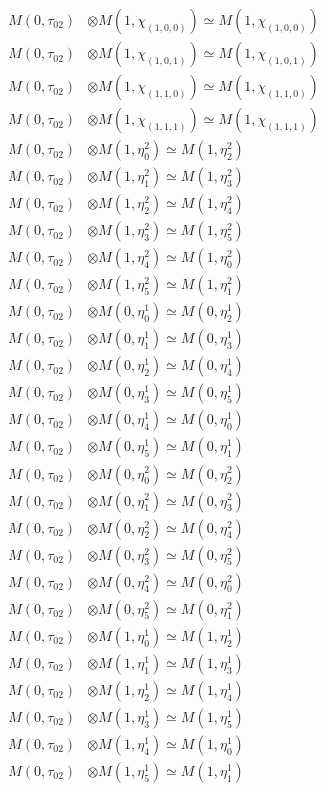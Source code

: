 \begin{align*}
M(0,\tau_{02}) &\otimes M(1,\chi_{(1,0,0)}) \simeq M(1,\chi_{(1,0,0)}) \\
M(0,\tau_{02}) &\otimes M(1,\chi_{(1,0,1)}) \simeq M(1,\chi_{(1,0,1)}) \\
M(0,\tau_{02}) &\otimes M(1,\chi_{(1,1,0)}) \simeq M(1,\chi_{(1,1,0)}) \\
M(0,\tau_{02}) &\otimes M(1,\chi_{(1,1,1)}) \simeq M(1,\chi_{(1,1,1)}) \\
M(0,\tau_{02}) &\otimes M(1,\eta^{2}_{0}) \simeq M(1,\eta^{2}_{2}) \\
M(0,\tau_{02}) &\otimes M(1,\eta^{2}_{1}) \simeq M(1,\eta^{2}_{3}) \\
M(0,\tau_{02}) &\otimes M(1,\eta^{2}_{2}) \simeq M(1,\eta^{2}_{4}) \\
M(0,\tau_{02}) &\otimes M(1,\eta^{2}_{3}) \simeq M(1,\eta^{2}_{5}) \\
M(0,\tau_{02}) &\otimes M(1,\eta^{2}_{4}) \simeq M(1,\eta^{2}_{0}) \\
M(0,\tau_{02}) &\otimes M(1,\eta^{2}_{5}) \simeq M(1,\eta^{2}_{1}) \\
M(0,\tau_{02}) &\otimes M(0,\eta^{1}_{0}) \simeq M(0,\eta^{1}_{2}) \\
M(0,\tau_{02}) &\otimes M(0,\eta^{1}_{1}) \simeq M(0,\eta^{1}_{3}) \\
M(0,\tau_{02}) &\otimes M(0,\eta^{1}_{2}) \simeq M(0,\eta^{1}_{4}) \\
M(0,\tau_{02}) &\otimes M(0,\eta^{1}_{3}) \simeq M(0,\eta^{1}_{5}) \\
M(0,\tau_{02}) &\otimes M(0,\eta^{1}_{4}) \simeq M(0,\eta^{1}_{0}) \\
M(0,\tau_{02}) &\otimes M(0,\eta^{1}_{5}) \simeq M(0,\eta^{1}_{1}) \\
M(0,\tau_{02}) &\otimes M(0,\eta^{2}_{0}) \simeq M(0,\eta^{2}_{2}) \\
M(0,\tau_{02}) &\otimes M(0,\eta^{2}_{1}) \simeq M(0,\eta^{2}_{3}) \\
M(0,\tau_{02}) &\otimes M(0,\eta^{2}_{2}) \simeq M(0,\eta^{2}_{4}) \\
M(0,\tau_{02}) &\otimes M(0,\eta^{2}_{3}) \simeq M(0,\eta^{2}_{5}) \\
M(0,\tau_{02}) &\otimes M(0,\eta^{2}_{4}) \simeq M(0,\eta^{2}_{0}) \\
M(0,\tau_{02}) &\otimes M(0,\eta^{2}_{5}) \simeq M(0,\eta^{2}_{1}) \\
M(0,\tau_{02}) &\otimes M(1,\eta^{1}_{0}) \simeq M(1,\eta^{1}_{2}) \\
M(0,\tau_{02}) &\otimes M(1,\eta^{1}_{1}) \simeq M(1,\eta^{1}_{3}) \\
M(0,\tau_{02}) &\otimes M(1,\eta^{1}_{2}) \simeq M(1,\eta^{1}_{4}) \\
M(0,\tau_{02}) &\otimes M(1,\eta^{1}_{3}) \simeq M(1,\eta^{1}_{5}) \\
M(0,\tau_{02}) &\otimes M(1,\eta^{1}_{4}) \simeq M(1,\eta^{1}_{0}) \\
M(0,\tau_{02}) &\otimes M(1,\eta^{1}_{5}) \simeq M(1,\eta^{1}_{1}) \\
\end{align*}

